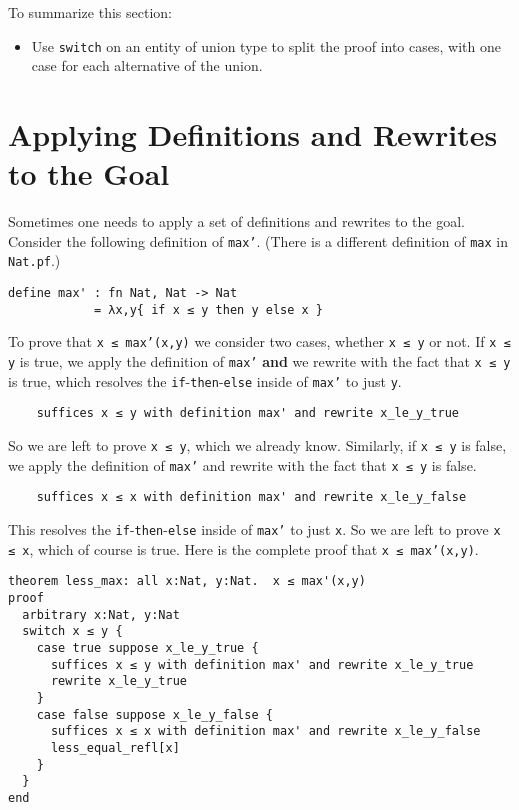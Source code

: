 \documentclass[12pt]{article}
\begin{document}
To summarize this section:
\begin{itemize}
\item Use \texttt{switch} on an entity of union type to split the
  proof into cases, with one case for each alternative of the union.
\end{itemize}

\pagebreak

\section{Applying Definitions and Rewrites to the Goal}

Sometimes one needs to apply a set of definitions and rewrites
to the goal. Consider the following definition of \texttt{max'}.
(There is a different definition of \texttt{max} in \texttt{Nat.pf}.)

\begin{verbatim}
define max' : fn Nat, Nat -> Nat
            = λx,y{ if x ≤ y then y else x }
\end{verbatim}

To prove that \texttt{x ≤ max'(x,y)} we consider two cases, whether
\texttt{x ≤ y} or not. If \texttt{x ≤ y} is true, we apply the
definition of \texttt{max'} \textbf{and} we rewrite with the fact that
\texttt{x ≤ y} is true, which resolves the
\texttt{if}-\texttt{then}-\texttt{else} inside of \texttt{max'} to
just \texttt{y}.

\begin{verbatim}
    suffices x ≤ y with definition max' and rewrite x_le_y_true
\end{verbatim}

\noindent So we are left to prove \texttt{x ≤ y}, which we already
know.  Similarly, if \texttt{x ≤ y} is false, we apply the definition
of \texttt{max'} and rewrite with the fact that \texttt{x ≤ y} is
false.

\begin{verbatim}
    suffices x ≤ x with definition max' and rewrite x_le_y_false
\end{verbatim}

\noindent This resolves the \texttt{if}-\texttt{then}-\texttt{else}
inside of \texttt{max'} to just \texttt{x}. So we are left to prove
\texttt{x ≤ x}, which of course is true.  Here is the complete proof
that \texttt{x ≤ max'(x,y)}.

\begin{verbatim}
theorem less_max: all x:Nat, y:Nat.  x ≤ max'(x,y)
proof
  arbitrary x:Nat, y:Nat
  switch x ≤ y {
    case true suppose x_le_y_true {
      suffices x ≤ y with definition max' and rewrite x_le_y_true
      rewrite x_le_y_true
    }
    case false suppose x_le_y_false {
      suffices x ≤ x with definition max' and rewrite x_le_y_false
      less_equal_refl[x]
    }
  }
end
\end{verbatim}
\end{document}
